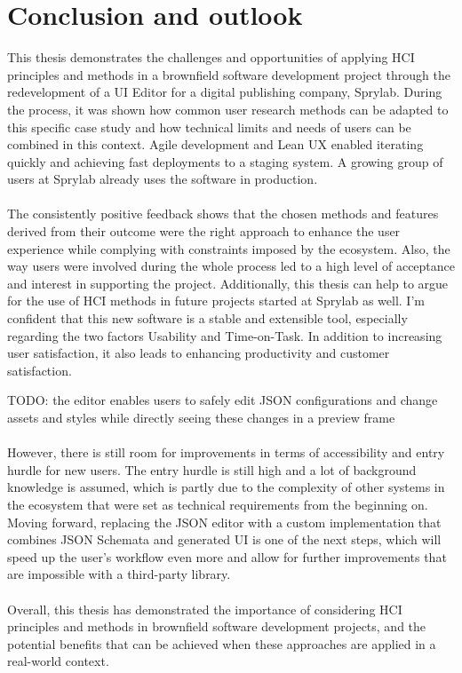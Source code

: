 %
\chapter{Conclusion and outlook}
\label{chap:conclusion}      
This thesis demonstrates the challenges and opportunities of applying HCI principles and methods in a brownfield software development project through the redevelopment of a UI Editor for a digital publishing company, Sprylab.
During the process, it was shown how common user research methods can be adapted to this specific case study and how technical limits and needs of users can be combined in this context.
Agile development and Lean UX enabled iterating quickly and achieving fast deployments to a staging system.
A growing group of users at Sprylab already uses the software in production.
\\\\
The consistently positive feedback shows that the chosen methods and features derived from their outcome were the right approach to enhance the user experience while complying with constraints imposed by the ecosystem.
Also, the way users were involved during the whole process led to a high level of acceptance and interest in supporting the project.
Additionally, this thesis can help to argue for the use of HCI methods in future projects started at Sprylab as well.
I'm confident that this new software is a stable and extensible tool, especially regarding the two factors Usability and Time-on-Task.
In addition to increasing user satisfaction, it also leads to enhancing productivity and customer satisfaction.

TODO: the editor enables users to safely edit JSON configurations and change assets and styles while directly seeing these changes in a preview frame
\\\\
However, there is still room for improvements in terms of accessibility and entry hurdle for new users.
The entry hurdle is still high and a lot of background knowledge is assumed, which is partly due to the complexity of other systems in the ecosystem that were set as technical requirements from the beginning on.
Moving forward, replacing the JSON editor with a custom implementation that combines JSON Schemata and generated UI is one of the next steps, which will speed up the user's
workflow even more and allow for further improvements that are impossible with a third-party library.
\\\\
Overall, this thesis has demonstrated the importance of considering HCI principles and methods in brownfield software development projects, and the potential benefits that can be achieved when these approaches are applied in a real-world context.